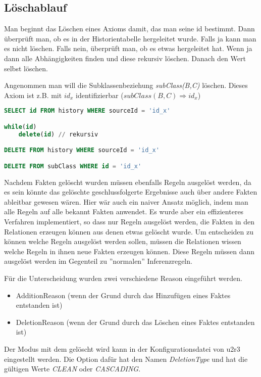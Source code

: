 \subsection{Löschablauf}
Man beginnt das Löschen eines Axioms damit, das man seine id bestimmt. Dann überprüft man, ob es in der Historientabelle hergeleitet wurde. Falls ja kann man es nicht löschen. Falls nein, überprüft man, ob es etwas hergeleitet hat. Wenn ja dann alle Abhängigkeiten finden und diese rekursiv löschen. Danach den Wert selbst löschen.

Angenommen man will die Subklassenbeziehung \emph{subClass(B,C)} löschen. Dieses Axiom ist z.B. mit $id_x$ identifizierbar ($subClass(B,C) \Rightarrow id_x$)
\begin{lstlisting}[language=SQL]
SELECT id FROM history WHERE sourceId = 'id_x'

while(id)
	delete(id) // rekursiv

DELETE FROM history WHERE sourceId = 'id_x'

DELETE FROM subClass WHERE id = 'id_x'
\end{lstlisting}


Nachdem Fakten gelöscht wurden müssen ebenfalls Regeln ausgelöst werden, da es sein könnte das gelöschte geschlussfolgerte Ergebnisse auch über andere Fakten ableitbar gewesen wären. 
Hier wär auch ein naiver Ansatz möglich, indem man alle Regeln auf alle bekannt Fakten anwendet. Es wurde aber ein effizienteres Verfahren implementiert, so dass nur Regeln ausgelöst werden, die Fakten in den Relationen erzeugen können aus denen etwas gelöscht wurde.
Um entscheiden zu können welche Regeln ausgelöst werden sollen, müssen die Relationen wissen welche Regeln in ihnen neue Fakten erzeugen können. Diese Regeln müssen dann ausgelöst werden im Gegenteil zu ''normalen'' Inferenzregeln.

Für die Unterscheidung wurden zwei verschiedene Reason eingeführt werden.
\begin{itemize}
  \item AdditionReason (wenn der Grund durch das Hinzufügen eines Faktes entstanden ist)
  \item DeletionReason (wenn der Grund durch das Löschen eines Faktes entstanden ist)
\end{itemize}

Der Modus mit dem gelöscht wird kann in der Konfigurationsdatei von u2r3 eingestellt werden. Die Option dafür hat den Namen \emph{DeletionType} und hat die gültigen Werte \emph{CLEAN} oder \emph{CASCADING}.

